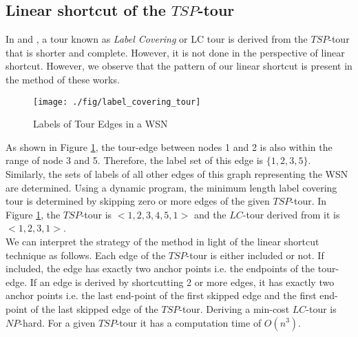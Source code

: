 \documentclass{llncs}
\begin{document}
\subsection{Linear shortcut of the $TSP$-tour}
In \cite{Sugihara:2008} and \cite{Sugihara:2011}, a tour known as \textit{Label Covering} or LC tour
is derived from the $TSP$-tour that is shorter and complete. However, it is not done in the perspective
of linear shortcut. However, we observe that the pattern of our linear shortcut is present in the
method of these works.
\begin{figure}[h!]
  \centering
    \texttt{[image: ./fig/label\_covering\_tour]} 
     \caption{Labels of Tour Edges in a WSN}
     \label{fig_label_covering_tour}  
\end{figure}

As shown in Figure \ref{fig_label_covering_tour}, the tour-edge between nodes 1 and 2 is also within
the range of node 3 and 5. Therefore, the label set of this edge is $\{1,2,3,5\}$. Similarly, the
sets of labels of all other edges of this graph representing the WSN are determined. Using a dynamic
program, the minimum length label covering tour is determined by skipping zero or more edges of the
given $TSP$-tour. In Figure \ref{fig_label_covering_tour}, the $TSP$-tour is $<1,2,3,4,5,1>$ and
the $LC$-tour derived from it is $<1,2,3,1>$.\\
We can interpret the strategy of the method in light of the linear shortcut technique as follows.
Each edge of the $TSP$-tour is either included or not. If included, the edge has exactly two anchor
points i.e. the endpoints of the tour-edge. If an edge is derived by shortcutting 2 or more edges, it has exactly
two anchor points i.e. the last end-point of the first skipped edge and the first end-point of the
last skipped edge of the $TSP$-tour. Deriving a min-cost $LC$-tour is $NP$-hard. For a given
$TSP$-tour it has a computation time of $O(n^3)$.
\end{document}
